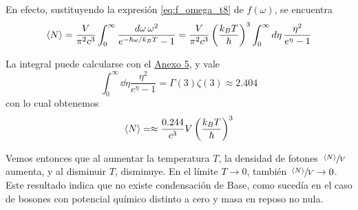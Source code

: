 En efecto, sustituyendo la expresión \eqref{eq:f_omega_t8} de $f(\omega)$, se encuentra
\begin{equation}
	\expval{N} = \frac{V}{\pi^2 c^3 } \int_0^\infty \frac{\dd{\omega} \omega^2}{e^{-\hbar\omega / k_BT} - 1} = \frac{V}{\pi^2 c^3 } \left( \frac{k_B T}{\hbar} \right)^3 \int_0^\infty \dd{\eta} \frac{\eta^2}{e^\eta - 1}
\end{equation}

La integral puede calcularse con el \hyperref[Anx5]{Anexo 5}, y vale
\begin{equation}
	\int_0^\infty \dd{\eta} \frac{\eta^2}{e^\eta - 1} = \Gamma(3)\zeta(3) \approx 2.404
\end{equation}
con lo cual obtenemos
\begin{equation}
	\expval{N} = \approx \frac{0.244}{c^3 } V \left( \frac{k_B T}{\hbar} \right)^3 
\end{equation}

Vemos entonces que al aumentar la temperatura $T$, la densidad de fotones $\sfrac{\expval{N}}{V}$ aumenta, y al disminuir $T$, disminuye.
En el límite $T \rightarrow 0$, también $\sfrac{\expval{N}}{V} \rightarrow 0$.
Este resultado indica que no existe condensación de Base, como sucedía en el caso de bosones con potencial químico distinto a cero y masa en reposo no nula.